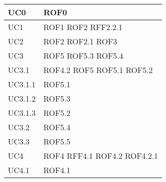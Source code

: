 \documentclass[../AnalisideiRequisiti.tex]{subfiles}
\begin{document}
\begin{longtable}{| p{4cm} | p{4cm} |}
	\hline
		\newline UC0 &  \newline ROF0 \\[1em]
	\hline
		\newline UC1 &  \newline ROF1 \newline ROF2 \newline RFF2.2.1   \\[1em]	
		\hline
		\newline UC2 &  \newline ROF2 	\newline ROF2.1 \newline ROF3 \\[1em]	
		\hline
		\newline UC3 &  \newline ROF5 \newline ROF5.3 \newline ROF5.4 \\[1em]	
		\hline
		\newline UC3.1 &  \newline ROF4.2 \newline ROF5 \newline ROF5.1 \newline ROF5.2  \\[1em]
		\hline
		\newline UC3.1.1 &  \newline ROF5.1 \\[1em]	
		\hline
		\newline UC3.1.2 &  \newline ROF5.3 \\[1em]
		\hline
		\newline UC3.1.3 &  \newline ROF5.2 \\[1em]
		\hline
		\newline UC3.2 &  \newline ROF5.4 \\[1em]
		\hline
		\newline UC3.3 &  \newline ROF5.5 \\[1em]
		\hline
		\newline UC4 &  \newline ROF4 \newline RFF4.1 \newline ROF4.2 \newline ROF4.2.1 \\[1em]
		\hline
		\newline UC4.1 &  \newline ROF4.1 \\[1em]

\end{longtable}
\end{document}
